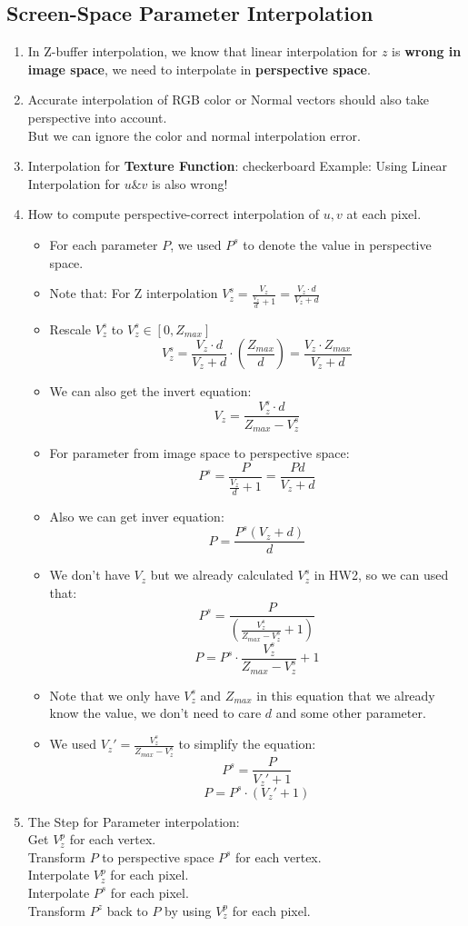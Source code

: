\documentclass[cyan,normal,en]{elegantnote}
\begin{document}
\subsection{Screen-Space Parameter Interpolation}
\begin{enumerate}
	\item In Z-buffer interpolation, we know that linear interpolation for $z$ is \textbf{wrong in image space}, we need to interpolate in \textbf{perspective space}.
	\item Accurate interpolation of RGB color or Normal vectors should also take perspective into account.\\
	But we can ignore the color and normal interpolation error.
	\item Interpolation for \textbf{Texture Function}: checkerboard Example: Using Linear Interpolation for $u\&v$ is also wrong!
	\item How to compute perspective-correct interpolation of $u,v$ at each pixel.
	\begin{itemize}
		\item For each parameter $P$, we used $P^s$ to denote the value in perspective space.
		\item Note that: For Z interpolation $V_z^s=\frac{V_z}{\frac{V_z}{d}+1}=\frac{V_z \cdot d}{V_z+d}$
		\item Rescale $V_z^s$ to $V_z^s \in [0,Z_{max}]$ 
		$$V_z^s=\frac{V_z \cdot d}{V_z+d} \cdot (\frac{Z_{max}}{d})=\frac{V_z \cdot Z_{max}}{V_z+d}$$
		\item We can also get the invert equation:
		$$V_z=\frac{V_z^s \cdot d}{Z_{max} - V_z^s}$$
		\item For parameter from image space to perspective space:
		$$P^s=\frac{P}{\frac{V_z}{d}+1}=\frac{Pd}{V_z+d}$$
		\item Also we can get inver equation:
		$$P=\frac{P^s(V_z+d)}{d}$$
		\item We don't have $V_z$ but we already calculated $V_z^s$ in HW2, so we can used that:
		$$P^s=\frac{P}{(\frac{V_z^s}{Z_{max} - V_z^s}+1)}$$
		$$P=P^s \cdot \frac{V_z^s}{Z_{max} - V_z^s}+1$$
		\item Note that we only have $V_z^s$ and $Z_{max}$ in this equation that we already know the value, we don't need to care $d$ and some other parameter.
		\item We used $V_z' = \frac{V_z^s}{Z_{max} - V_z^s}$ to simplify the equation:
		$$P^s=\frac{P}{V_z' +1}$$
		$$P=P^s \cdot(V_z'+1)$$
	\end{itemize}
	\item The Step for Parameter interpolation:\\
	Get $V_z^p$ for each vertex.\\
	Transform $P$ to perspective space $P^s$ for each vertex.\\
	Interpolate $V_z^p$ for each pixel.\\
	Interpolate $P^s$ for each pixel. \\
	Transform $P^z$ back to $P$ by using $V_z^p$ for each pixel.
\end{enumerate}
\newpage
\end{document}
